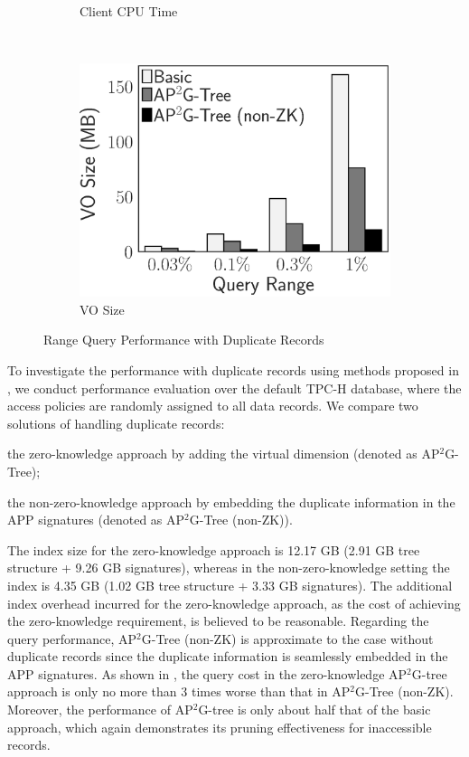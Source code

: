 \begin{figure}[t]
\begin{subfigure}{.33\linewidth}
        \caption{Client CPU Time}
    \end{subfigure}~%
    \begin{subfigure}{.33\linewidth}
        \includegraphics[height=\ht\figbox]{exp-figs/access-control/dup_vo.eps}
        \caption{VO Size}
    \end{subfigure}
    \caption{Range Query Performance with Duplicate Records}\label{exp-fig:access-control:dup}
\end{figure}

To investigate the performance with duplicate records using methods proposed in , we conduct performance evaluation over the default TPC-H database, where the access policies are randomly assigned to all data records.
We compare two solutions of handling duplicate records:
\begin{inlineenum}
    \item the zero-knowledge approach by adding the virtual dimension (denoted as AP$^2$G-Tree);
    \item the non-zero-knowledge approach by embedding the duplicate information in the APP signatures (denoted as AP$^2$G-Tree (non-ZK)).
\end{inlineenum}
The index size for the zero-knowledge approach is 12.17 GB (2.91 GB tree structure + 9.26 GB signatures), whereas in the non-zero-knowledge setting the index is 4.35 GB (1.02 GB tree structure + 3.33 GB signatures). The additional index overhead incurred for the zero-knowledge approach, as the cost of achieving the zero-knowledge requirement, is believed to be reasonable. Regarding the query performance, AP$^2$G-Tree (non-ZK) is approximate to the case without duplicate records since the duplicate information is seamlessly embedded in the APP signatures. As shown in , the query cost in the zero-knowledge AP$^2$G-tree approach is only no more than 3 times worse than that in AP$^2$G-Tree (non-ZK). Moreover, the performance of AP$^2$G-tree is only about half that of the basic approach, which again demonstrates its pruning effectiveness for inaccessible records.

